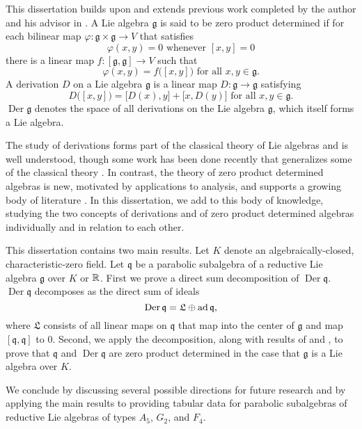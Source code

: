 \documentclass[11pt]{article}
\begin{document}

\makeletterhead

\maketitle

\vfill

This dissertation builds upon and extends previous work completed by the
author and his advisor in \cite{article:brice2015zero}.
%
A Lie algebra $\mathfrak g$ is said to be zero product determined if for
each bilinear map $\varphi : \mathfrak{g} \times \mathfrak{g} \to V$
that satisfies
\[
  \varphi(x,y)=0 \text{ whenever } [x,y] = 0
\]
there is a linear map $f : [\mathfrak{g}, \mathfrak{g}] \to V$ such that
\[
  \varphi(x,y) = f\big([x,y] \big)
  \text{ for all }
  x, y \in \mathfrak{g}
  \text{.}
\]
%
A derivation $D$ on a Lie algebra $\mathfrak{g}$ is a linear map
$D : \mathfrak{g} \to \mathfrak{g}$ satisfying
\[
  D\big([x,y]\big) = \big[D(x),y\big] + \big[x,D(y)\big]
  \text{ for all }
  x, y \in \mathfrak{g}
  \text{.}
\]
%
$\mathop{\mathrm{Der}} \mathfrak{g}$ denotes the space of all
derivations on the Lie algebra $\mathfrak{g}$,
which itself forms a Lie algebra.

The study of derivations forms part of the classical theory of Lie
algebras and is well understood,
though some work has been done recently that generalizes some of the
classical theory
%
\cite{%
  dixmier1957derivations,
  farnsteiner1988derivations,
  jacobson1955note,
  ou2007derivations,
  sato1965derivations,
  togo1961derivation,
  wang2008derivations,
  wang2006derivations,
  wang2010product,
  zhang2008class%
}.
%
In contrast, the theory of zero product determined algebras is new,
motivated by applications to analysis,
and supports a growing body of literature
%
\cite{%
  alaminos2009maps,
  brevsar2009zero,
  gravsivc2010zero,
  article:brice2015zero,
  wang2011class%
}.
%
In this dissertation, we add to this body of knowledge,
studying the two concepts of derivations and of zero product determined
algebras individually and in relation to each other.

This dissertation contains two main results.
%
Let $K$ denote an algebraically-closed, characteristic-zero field.
%
Let $\mathfrak{q}$ be a parabolic subalgebra of a reductive Lie algebra
$\mathfrak{g}$ over $K$ or $\mathbb{R}$.
%
First we prove a direct sum decomposition of
$\mathop{\mathrm{Der}} \mathfrak{q}$.
%
$\mathop{\mathrm{Der}} \mathfrak{q}$ decomposes as the direct sum of
ideals
\[
  \mathop{\mathrm{Der}} \mathfrak{q}
  = \mathfrak{L} \oplus \operatorname{ad} \mathfrak{q}
  \text{,}
\]
where $\mathfrak{L}$ consists of all linear maps on $\mathfrak{q}$ that
map into the center of $\mathfrak{g}$ and map
$[\mathfrak{q}, \mathfrak{q}]$ to $0$.
%
Second, we apply the decomposition,
along with results of
\cite{article:brice2015zero} and \cite{wang2011class},
to prove that $\mathfrak{q}$ and $\mathop{\mathrm{Der}} \mathfrak{q}$
are zero product determined in the case that $\mathfrak{g}$
is a Lie algebra over $K$.

We conclude by discussing several possible directions for future
research and by applying the main results to providing tabular data for
parabolic subalgebras of reductive Lie algebras of types $A_5$, $G_2$,
and $F_4$.

\printbibliography[heading=none]

\label{page:last}
\end{document}
